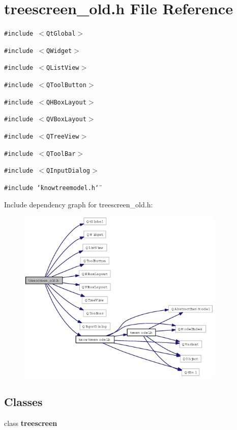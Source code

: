 \section{treescreen\_\-old.h File Reference}
\label{treescreen__old_8h}
{\tt \#include $<$Qt\-Global$>$}\par
{\tt \#include $<$QWidget$>$}\par
{\tt \#include $<$QList\-View$>$}\par
{\tt \#include $<$QTool\-Button$>$}\par
{\tt \#include $<$QHBox\-Layout$>$}\par
{\tt \#include $<$QVBox\-Layout$>$}\par
{\tt \#include $<$QTree\-View$>$}\par
{\tt \#include $<$QTool\-Bar$>$}\par
{\tt \#include $<$QInput\-Dialog$>$}\par
{\tt \#include \char`\"{}knowtreemodel.h\char`\"{}}\par


Include dependency graph for treescreen\_\-old.h:\begin{figure}[H]
\begin{center}
\leavevmode
\includegraphics[width=279pt]{treescreen__old_8h__incl}
\end{center}
\end{figure}
\subsection*{Classes}
\begin{CompactItemize}
\item 
class {\bf treescreen}
\end{CompactItemize}
